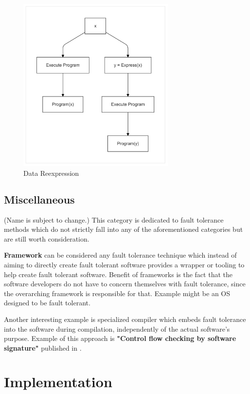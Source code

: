 \documentclass[12pt, letterpaper]{article}
\begin{document}
\begin{figure}[hbt]
    \centering
    \includegraphics[width=0.7\textwidth]{diagrams/data_div/reexpress.png}
    \caption{Data Reexpression}
    \label{fig:data_rex}
\end{figure}

\subsection{Miscellaneous}
(Name is subject to change.)
This category is dedicated to fault tolerance methods which do not strictly fall into any of the aforementioned categories but are still worth consideration.

\textbf{Framework} can be considered any fault tolerance technique which instead of aiming to directly create fault tolerant software provides a wrapper or tooling to help create fault tolerant software. Benefit of frameworks is the fact that the software developers do not have to concern themselves with fault tolerance, since the overarching framework is responsible for that. Example might be an OS designed to be fault tolerant.

Another interesting example is specialized compiler which embeds fault tolerance into the software during compilation, independently of the actual software's purpose. Example of this approach is \textbf{"Control flow checking by software signature"} published in \cite{994926}.

\section{Implementation}
\end{document}
